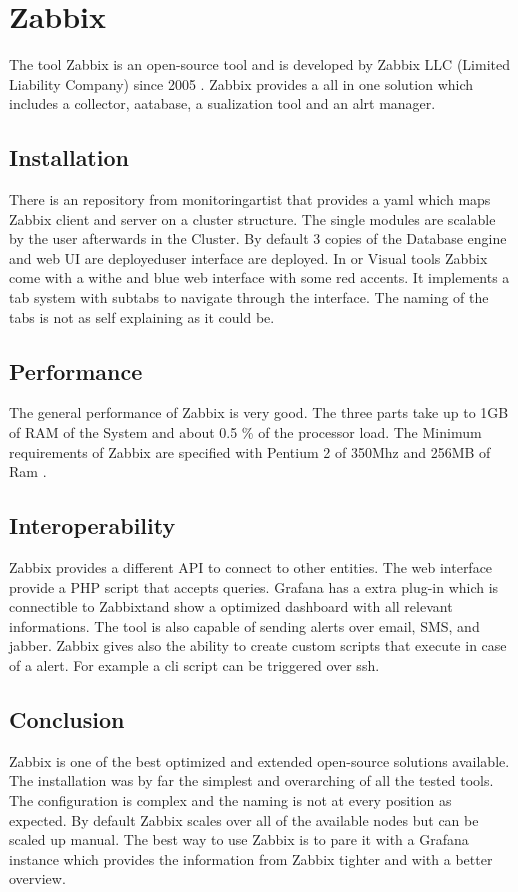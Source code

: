 \section{Zabbix}
\label{Zabbix} %
\cite{Hernantes2015}
The tool Zabbix is an open-source tool and is developed by Zabbix LLC (Limited Liability Company) since 2005 \cite{zabbix}. Zabbix provides a all in one solution which includes a collector, aatabase, a sualization tool and an alrt manager.
\subsection{Installation}
There is an repository from monitoringartist \cite{zabbix_kube} that provides a yaml which maps Zabbix client and server on a cluster structure. The single modules are scalable by the user afterwards in the Cluster. By default 3 copies of the Database engine and web UI are deployeduser interface are deployed. In or Visual tools
Zabbix come with a withe and blue web interface with some red accents. It implements a tab system with subtabs to navigate through the interface. The naming of the tabs is not as self explaining as it could be.  
\subsection{Performance}
The general performance of Zabbix is very good. The three parts take up to 1GB of RAM of the System and about 0.5 \% of the processor load. The Minimum requirements of Zabbix are specified with Pentium 2 of 350Mhz and 256MB of Ram \cite{Marik2014}.
\subsection{Interoperability}
Zabbix provides a different API to connect to other entities. The web interface  provide a PHP script that accepts queries. Grafana has a extra plug-in which is connectible to Zabbixtand show a optimized dashboard with all relevant informations. The tool is also capable of sending alerts over email, SMS, and jabber. Zabbix gives also the ability to create custom scripts that execute in case of a alert. For example a cli script can be triggered over ssh. 
\subsection{Conclusion}
Zabbix is one of the best optimized and extended open-source solutions available. The installation was by far the simplest and overarching of all the tested tools. The configuration is complex and the naming is not at every position as expected. By default Zabbix scales over all of the available nodes but can be scaled up manual. The best way to use Zabbix is to pare it with a Grafana instance which provides the information from Zabbix tighter and with a better overview.

